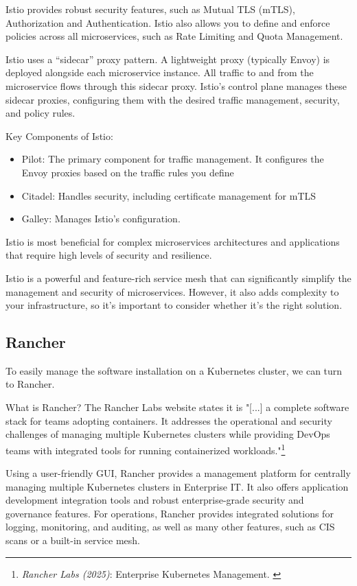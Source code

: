 Istio provides robust security features, such as Mutual TLS (mTLS),
Authorization and Authentication. Istio also allows you to define and
enforce policies across all microservices, such as Rate Limiting and
Quota Management.

Istio uses a ``sidecar'' proxy pattern. A lightweight proxy (typically
Envoy) is deployed alongside each microservice instance. All traffic to
and from the microservice flows through this sidecar proxy. Istio's
control plane manages these sidecar proxies, configuring them with the
desired traffic management, security, and policy rules.

Key Components of Istio:

\begin{itemize}
	\item Pilot: The primary component for traffic management. It configures the Envoy proxies based on the traffic rules you define
	\item Citadel: Handles security, including certificate management for mTLS
	\item Galley: Manages Istio's configuration.
\end{itemize}

Istio is most beneficial for complex microservices architectures and
applications that require high levels of security and resilience.

Istio is a powerful and feature-rich service mesh that can significantly
simplify the management and security of microservices. However, it also
adds complexity to your infrastructure, so it's important to consider
whether it's the right solution.


\subsection{Rancher}

To easily manage the software installation on a Kubernetes cluster, we can turn to Rancher.

What is Rancher? The Rancher Labs website states it is "[...] a complete software stack for teams adopting containers. It addresses the operational and security challenges of managing multiple Kubernetes clusters while providing DevOps teams with integrated tools for running containerized workloads."\footnote{\textit{Rancher Labs (2025)}: Enterprise Kubernetes Management. \cite{rancher}}

Using a user-friendly GUI, Rancher provides a management platform for centrally managing multiple Kubernetes clusters in Enterprise IT. It also offers application development integration tools and robust enterprise-grade security and governance features. For operations, Rancher provides integrated solutions for logging, monitoring, and auditing, as well as many other features, such as CIS scans or a built-in service mesh.

